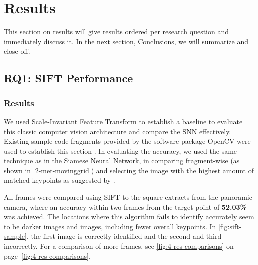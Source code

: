 \documentclass[sigconf, natbib=false, nonacm]{acmart}
\begin{document}
\section{Results}
    This section on results will give results ordered per research question and immediately discuss it. In the next section, Conclusions, we will summarize and close off. 

    \subsection{RQ1: SIFT Performance}
        \subsubsection{Results}
        We used Scale-Invariant Feature Transform to establish a baseline to evaluate this classic computer vision architecture and compare the SNN effectively. Existing sample code fragments provided by the software package OpenCV were used to establish this section \cite{OpenCV2020, OpenCV2020a}. In evaluating the accuracy, we used the same technique as in the Siamese Neural Network, in comparing fragment-wise (as shown in \autoref{2-met-movinggrid}) and selecting the image with the highest amount of matched keypoints as suggested by \cite{OpenCV2020}. 
        
        All frames were compared using SIFT to the square extracts from the panoramic camera, where an accuracy within two frames from the target point of \textbf{52.03\%} was achieved. The locations where this algorithm fails to identify accurately seem to be darker images and images, including fewer overall keypoints. In \autoref{fig:sift-sample}, the first image is correctly identified and the second and third incorrectly. For a comparison of more frames, see \autoref{fig:4-res-comparisons} on page~\ref{fig:4-res-comparisons}. 
        
\end{document}
